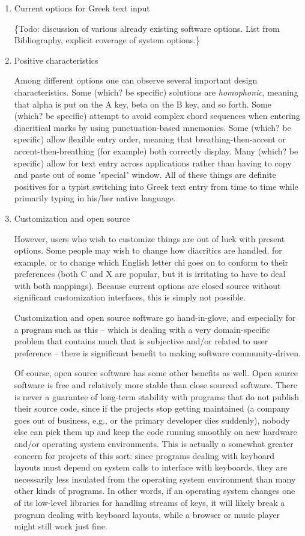 \documentclass[11pt]{article}
\begin{document}
\begin{enumerate}
\item Current options for Greek text input
\label{sec:org8232acd}

\{Todo: discussion of various already existing software options. List from Bibliography, explicit coverage of system options.\}

\item Positive characteristics
\label{sec:org465cd47}

Among different options one can observe several important design characteristics. Some (which? be specific) solutions are \emph{homophonic}, meaning that alpha is put on the A key, beta on the B key, and so forth. Some (which? be specific) attempt to avoid complex chord sequences when entering diacritical marks by using punctuation-based mnemonics. Some (which? be specific) allow flexible entry order, meaning that breathing-then-accent or accent-then-breathing (for example) both correctly display. Many (which? be specific) allow for text entry across applications rather than having to copy and paste out of some "special" window. All of these things are definite positives for a typist switching into Greek text entry from time to time while primarily typing in his/her native language.

\item Customization and open source
\label{sec:orge3f9683}

However, users who wish to customize things are out of luck with present options. Some people may wish to change how diacritics are handled, for example, or to change which English letter chi goes on to conform to their preferences (both C and X are popular, but it is irritating to have to deal with both mappings). Because current options are closed source without significant customization interfaces, this is simply not possible.

Customization and open source software go hand-in-glove, and especially for a program such as this -- which is dealing with a very domain-specific problem that contains much that is subjective and/or related to user preference -- there is significant benefit to making software community-driven. 

Of course, open source software has some other benefits as well. Open source software is free and relatively more stable than close sourced software. There is never a guarantee of long-term stability with programs that do not publish their source code, since if the projects stop getting maintained (a company goes out of business, e.g., or the primary developer dies suddenly), nobody else can pick them up and keep the code running smoothly on new hardware and/or operating system environments. This is actually a somewhat greater concern for projects of this sort: since programs dealing with keyboard layouts must depend on system calls to interface with keyboards, they are necessarily less insulated from the operating system environment than many other kinds of programs. In other words, if an operating system changes one of its low-level libraries for handling streams of keys, it will likely break a program dealing with keyboard layouts, while a browser or music player might still work just fine.


\end{enumerate}
\end{document}
